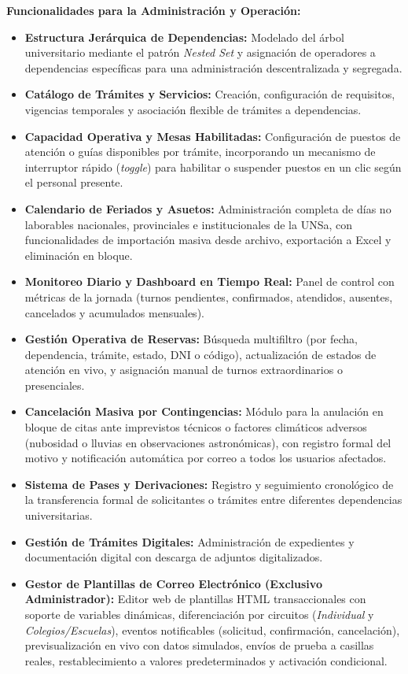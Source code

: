 \textbf{Funcionalidades para la Administración y Operación:}
\begin{itemize}
    \item \textbf{Estructura Jerárquica de Dependencias:} Modelado del árbol universitario mediante el patrón \textit{Nested Set} y asignación de operadores a dependencias específicas para una administración descentralizada y segregada.
    \item \textbf{Catálogo de Trámites y Servicios:} Creación, configuración de requisitos, vigencias temporales y asociación flexible de trámites a dependencias.
    \item \textbf{Capacidad Operativa y Mesas Habilitadas:} Configuración de puestos de atención o guías disponibles por trámite, incorporando un mecanismo de interruptor rápido (\textit{toggle}) para habilitar o suspender puestos en un clic según el personal presente.
    \item \textbf{Calendario de Feriados y Asuetos:} Administración completa de días no laborables nacionales, provinciales e institucionales de la UNSa, con funcionalidades de importación masiva desde archivo, exportación a Excel y eliminación en bloque.
    \item \textbf{Monitoreo Diario y Dashboard en Tiempo Real:} Panel de control con métricas de la jornada (turnos pendientes, confirmados, atendidos, ausentes, cancelados y acumulados mensuales).
    \item \textbf{Gestión Operativa de Reservas:} Búsqueda multifiltro (por fecha, dependencia, trámite, estado, DNI o código), actualización de estados de atención en vivo, y asignación manual de turnos extraordinarios o presenciales.
    \item \textbf{Cancelación Masiva por Contingencias:} Módulo para la anulación en bloque de citas ante imprevistos técnicos o factores climáticos adversos (nubosidad o lluvias en observaciones astronómicas), con registro formal del motivo y notificación automática por correo a todos los usuarios afectados.
    \item \textbf{Sistema de Pases y Derivaciones:} Registro y seguimiento cronológico de la transferencia formal de solicitantes o trámites entre diferentes dependencias universitarias.
    \item \textbf{Gestión de Trámites Digitales:} Administración de expedientes y documentación digital con descarga de adjuntos digitalizados.
    \item \textbf{Gestor de Plantillas de Correo Electrónico (Exclusivo Administrador):} Editor web de plantillas HTML transaccionales con soporte de variables dinámicas, diferenciación por circuitos (\textit{Individual} y \textit{Colegios/Escuelas}), eventos notificables (solicitud, confirmación, cancelación), previsualización en vivo con datos simulados, envíos de prueba a casillas reales, restablecimiento a valores predeterminados y activación condicional.

\end{itemize}
